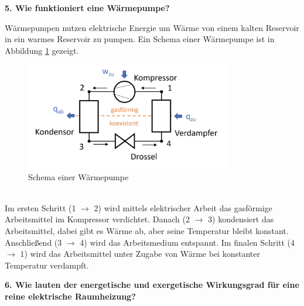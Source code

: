 \noindent\textbf{5. Wie funktioniert eine Wärmepumpe?}\\
\begin{addmargin}[25pt]{0pt} 
Wärmepumpen nutzen elektrische Energie um Wärme von einem kalten Reservoir in ein warmes Reservoir zu pumpen. Ein Schema einer Wärmepumpe ist in Abbildung \ref{fig:heat_pump} gezeigt.
\begin{figure}[h]
    \centering
    \includegraphics[width=0.8\textwidth]{images/Energiewissenschaften/Heat_pump.jpeg}
    \caption{Schema einer Wärmepumpe}
    \label{fig:heat_pump}
\end{figure} \\
Im ersten Schritt (1 $\rightarrow$ 2) wird mittels elektrischer Arbeit das gasförmige Arbeitsmittel im Kompressor verdichtet. Danach (2 $\rightarrow$ 3) kondensiert das Arbeitsmittel, dabei gibt es Wärme ab, aber seine Temperatur bleibt konstant. Anschließend (3 $\rightarrow$ 4) wird das Arbeitsmedium entspannt. Im finalen Schritt (4 $\rightarrow$ 1) wird das Arbeitsmittel unter Zugabe von Wärme bei konstanter Temperatur verdampft.\\  
\end{addmargin}
\newpage
\noindent\textbf{6. Wie lauten der energetische und exergetische Wirkungsgrad für eine reine elektrische Raumheizung?}\\
